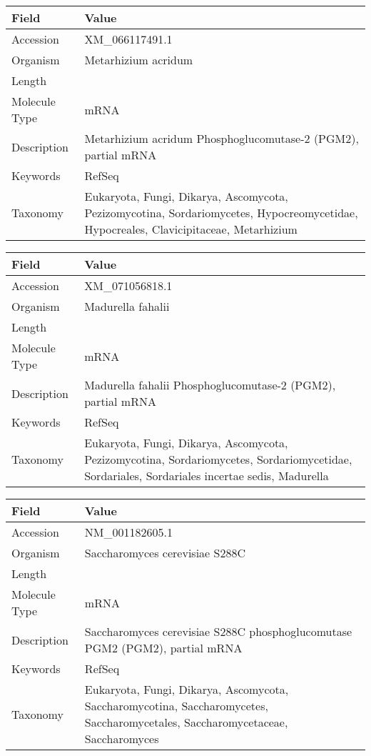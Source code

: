 \documentclass[10pt]{article}
\begin{document}
{\footnotesize
\begin{longtable}{>{\raggedright\arraybackslash}p{4.5cm} >{\raggedright\arraybackslash}p{11.5cm}}
\textbf{Field} & \textbf{Value} \\
\hline
Accession & XM\_066117491.1 \\
Organism & Metarhizium acridum \\
Length & 1662 \\
Molecule Type & mRNA \\
Description & Metarhizium acridum Phosphoglucomutase-2 (PGM2), partial mRNA \\
Keywords & RefSeq \\
Taxonomy & Eukaryota, Fungi, Dikarya, Ascomycota, Pezizomycotina, Sordariomycetes, Hypocreomycetidae, Hypocreales, Clavicipitaceae, Metarhizium \\
\end{longtable}
}

{\footnotesize
\begin{longtable}{>{\raggedright\arraybackslash}p{4.5cm} >{\raggedright\arraybackslash}p{11.5cm}}
\textbf{Field} & \textbf{Value} \\
\hline
Accession & XM\_071056818.1 \\
Organism & Madurella fahalii \\
Length & 1665 \\
Molecule Type & mRNA \\
Description & Madurella fahalii Phosphoglucomutase-2 (PGM2), partial mRNA \\
Keywords & RefSeq \\
Taxonomy & Eukaryota, Fungi, Dikarya, Ascomycota, Pezizomycotina, Sordariomycetes, Sordariomycetidae, Sordariales, Sordariales incertae sedis, Madurella \\
\end{longtable}
}

{\footnotesize
\begin{longtable}{>{\raggedright\arraybackslash}p{4.5cm} >{\raggedright\arraybackslash}p{11.5cm}}
\textbf{Field} & \textbf{Value} \\
\hline
Accession & NM\_001182605.1 \\
Organism & Saccharomyces cerevisiae S288C \\
Length & 1710 \\
Molecule Type & mRNA \\
Description & Saccharomyces cerevisiae S288C phosphoglucomutase PGM2 (PGM2), partial mRNA \\
Keywords & RefSeq \\
Taxonomy & Eukaryota, Fungi, Dikarya, Ascomycota, Saccharomycotina, Saccharomycetes, Saccharomycetales, Saccharomycetaceae, Saccharomyces \\
\end{longtable}
}
\end{document}
